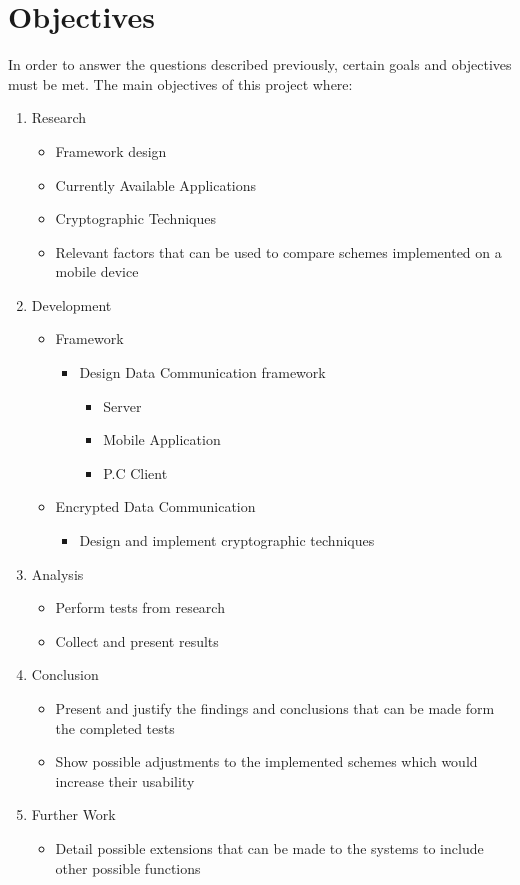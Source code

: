 \documentclass[a4paper,12pt]{report}
\begin{document}
\chapter{Objectives} 

In order to answer the questions described previously, certain goals and objectives must be met. The main objectives of this project where: 

\begin{enumerate}
  \item Research
  \begin{itemize}
    \item Framework design
    \item Currently Available Applications
    \item Cryptographic Techniques
    \item Relevant factors that can be used to compare schemes implemented on a mobile device
  \end{itemize}
  \item Development
  \begin{itemize}
    \item Framework
    \begin{itemize} 
      \item Design Data Communication framework
      \begin{itemize}
        \item Server
        \item Mobile Application
        \item P.C Client
      \end{itemize}
    \end{itemize}
  \item Encrypted Data Communication
  \begin{itemize}
    \item Design and implement cryptographic techniques
  \end{itemize}
  \end{itemize}
  \item Analysis
  \begin{itemize}
    \item Perform tests from research
    \item Collect and present results
  \end{itemize}
  \item Conclusion
  \begin{itemize}
    \item Present and justify the findings and conclusions that can be made form the completed tests
    \item Show possible adjustments to the implemented schemes which would increase their usability
  \end{itemize}
  \item Further Work
  \begin{itemize}
    \item Detail possible extensions that can be made to the systems to include other possible functions
  \end{itemize}
\end{enumerate}
\end{document}

